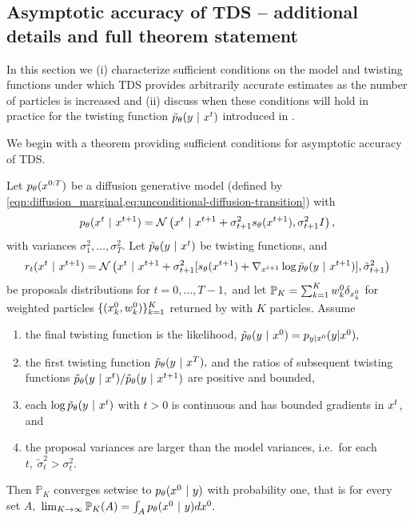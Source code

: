 \subsection{Asymptotic accuracy of TDS -- additional details and full theorem statement}\label{sec:theorem_statement_and_proof}
In this section we (i) characterize sufficient conditions on the model and twisting functions under which TDS provides arbitrarily accurate estimates as the number of particles is increased and 
(ii) discuss when these conditions will hold in practice for the twisting function $\tilde p_\theta(y~\vert~ x^{t})$ introduced in .

We begin with a theorem providing sufficient conditions for asymptotic accuracy of TDS.
\begin{theorem}\label{thm:twisted_SMC_complete}
Let $p_{\theta}(x^{0:T})$ be a diffusion generative model
(defined by \cref{eqn:diffusion_marginal,eq:unconditional-diffusion-transition})
with 
$$
p_{\theta}(x^{t} ~\vert~ x^{t+1}) = \mathcal{N}\left(x^{t} ~\vert~ x^{t+1} + \sigma_{t+1}^2 s_\theta(x^{t+1}), \sigma_{t+1}^2 I
\right),$$
with variances $\sigma_1^2, \dots, \sigma_T^2.$ 
Let $\tilde p_\theta(y ~\vert~ x^{t})$ be twisting functions,
and 
$$
r_t(x^{t} ~\vert~ x^{t+1}) = 
\mathcal{N}\left(
x^{t} ~\vert~ x^{t+1} + \sigma_{t+1}^2 [s_\theta(x^{t+1}) + \nabla_{x^{t+1}}\log \tilde p_\theta(y~\vert~ x^{t+1})], 
\tilde \sigma_{t+1}^2 \right)
$$
be proposals distributions for $t=0,\dots, T-1,$
and let $\mathbb{P}_{K}=\sum_{k=1}^K w_k^{0}\delta_{x_k^{0}}$ for weighted particles $\{(x_k^{0}, w_k^{0})\}_{k=1}^K$ returned by  with $K$ particles.
Assume
\begin{enumerate}[label=(\alph*)]
    \item{the final twisting function is the likelihood, $\tilde p_\theta(y~\vert~ x^{0})=p_{y|x^{0}}({y}|{x^{0}}),$} \label{item:final_twist}
    \item{the first twisting function $\tilde p_\theta(y ~\vert~ x^{T}),$ and the ratios of subsequent twisting functions $\tilde p_\theta(y ~\vert~ x^{t}) / \tilde p_\theta(y ~\vert~ x^{t+1}) $ are positive and bounded,}\label{item:twist_assumption}
    \item{each $\log \tilde p_\theta(y~\vert~ x^{t})$ with $t>0$ is continuous and has bounded gradients in $x^{t}$, and}\label{item:twist_gradient}
    \item{the proposal variances are larger than the model variances, i.e.\ for each $t,\ \tilde \sigma_t^2 >\sigma_t^2.$} \label{item:proposal_var}
\end{enumerate}
Then $\mathbb{P}_{K}$ converges setwise to $p_{\theta}(x^{0}~\vert~ y)$ with probability one,
that is 
for every set $A,$ 
$\lim_{K\rightarrow\infty} \mathbb{P}_{K}(A) = \int_A p_{\theta}(x^{0}~\vert~ y) dx^{0}.$
\end{theorem}

